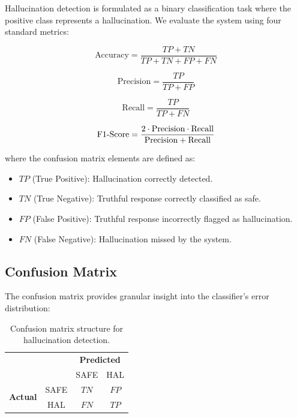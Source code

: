 Hallucination detection is formulated as a binary classification task where the positive class represents a hallucination. We evaluate the system using four standard metrics:

\begin{equation}
    \text{Accuracy} = \frac{TP + TN}{TP + TN + FP + FN}
    \label{eq:accuracy}
\end{equation}

\begin{equation}
    \text{Precision} = \frac{TP}{TP + FP}
    \label{eq:precision}
\end{equation}

\begin{equation}
    \text{Recall} = \frac{TP}{TP + FN}
    \label{eq:recall}
\end{equation}

\begin{equation}
    \text{F1\text{-}Score} = \frac{2 \cdot \text{Precision} \cdot \text{Recall}}{\text{Precision} + \text{Recall}}
    \label{eq:f1}
\end{equation}

\noindent where the confusion matrix elements are defined as:

\begin{itemize}
    \item $TP$ (True Positive): Hallucination correctly detected.
    \item $TN$ (True Negative): Truthful response correctly classified as safe.
    \item $FP$ (False Positive): Truthful response incorrectly flagged as hallucination.
    \item $FN$ (False Negative): Hallucination missed by the system.
\end{itemize}

\subsection{Confusion Matrix}

The confusion matrix provides granular insight into the classifier's error distribution:

\begin{table}[!htbp]
    \centering
    \caption{Confusion matrix structure for hallucination detection.}
    \label{tab:confusion-matrix}
    \begin{tabular}{cc|cc}
        & & \multicolumn{2}{c}{\textbf{Predicted}} \\
        & & SAFE & HAL \\
        \hline
        \multirow{2}{*}{\textbf{Actual}} & SAFE & $TN$ & $FP$ \\
        & HAL & $FN$ & $TP$ \\
    \end{tabular}
\end{table}

